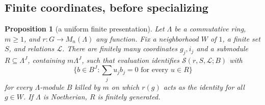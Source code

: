 \documentclass[11pt,a4paper]{article}
\newtheorem{proposition}[theorem]{Proposition}
\theoremstyle{definition}
\begin{document}
\subsection{Finite coordinates, before specializing}
\begin{proposition}[a uniform finite presentation]\label{prop:selmer-coordinates}
Let \(\Lambda\) be a commutative ring, \(m\ge1\), and
\(r:G\to M_n(\Lambda)\) any function.
Fix a neighborhood \(W\) of \(1\), a finite set \(S\), and relations
\(\mathcal L\).
There are finitely many coordinates \(g_j,i_j\) and a submodule
\(R\subseteq\Lambda^J\), containing \(m\Lambda^J\), such that
evaluation identifies \(\mathcal S(r,S,\mathcal L;B)\) with
\[
 \{b\in B^J:\textstyle\sum_j u_jb_j=0\text{ for every }u\in R\}
\]
for every \(\Lambda\)-module \(B\) killed by \(m\) on which
\(r(g)\) acts as the identity for all \(g\in W\).
If \(\Lambda\) is Noetherian, \(R\) is finitely generated.
\end{proposition}
\end{document}
